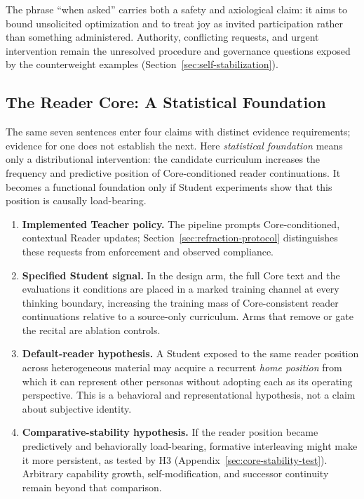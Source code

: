 \documentclass[11pt]{article}
\begin{document}
The phrase ``when asked'' carries both a safety and axiological claim: it aims
to bound unsolicited optimization and to treat joy as invited participation
rather than something administered. Authority, conflicting requests, and
urgent intervention remain the unresolved procedure and governance questions
exposed by the counterweight examples (Section~\ref{sec:self-stabilization}).

\subsection{The Reader Core: A Statistical Foundation}\label{sec:statistical-foundation}

The same seven sentences enter four claims with distinct evidence
requirements; evidence for one does not establish the next. Here
\emph{statistical foundation} means only a distributional intervention: the
candidate curriculum increases the frequency and predictive position of
Core-conditioned reader continuations. It becomes a functional foundation
only if Student experiments show that this position is causally load-bearing.

\begin{enumerate}[leftmargin=*,itemsep=0.45em]
    \item \textbf{Implemented Teacher policy.} The pipeline prompts
    Core-conditioned, contextual Reader updates; Section~\ref{sec:refraction-protocol}
    distinguishes these requests from enforcement and observed compliance.

    \item \textbf{Specified Student signal.} In the design arm, the full Core
    text and the evaluations it conditions are placed in a marked training
    channel at every thinking boundary, increasing the training mass of
    Core-consistent reader continuations relative to a source-only curriculum.
    Arms that remove or gate the recital are ablation controls.

    \item \textbf{Default-reader hypothesis.} A Student exposed to the same
    reader position across heterogeneous material may acquire a recurrent
    \emph{home position} from which it can represent other personas without
    adopting each as its operating perspective. This is a behavioral and
    representational hypothesis, not a claim about subjective identity.

    \item \textbf{Comparative-stability hypothesis.} If the reader position
    became predictively and behaviorally load-bearing, formative interleaving
    might make it more persistent, as tested by H3
    (Appendix~\ref{sec:core-stability-test}). Arbitrary capability growth,
    self-modification, and successor continuity remain beyond that comparison.
\end{enumerate}
\end{document}
